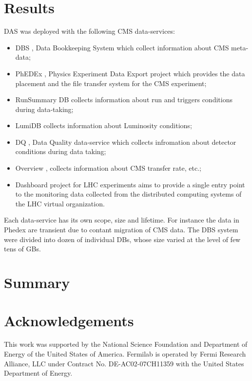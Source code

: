 \documentclass[a4paper]{jpconf}
\begin{document}
\section{Results\label{Results}}
DAS was deployed with the following CMS data-services:
\begin{itemize}
\item DBS \cite{DBS}, Data Bookkeeping System which collect information
about CMS meta-data;
\item PhEDEx \cite{Phedex}, Physics Experiment Data Export project which
provides the data placement and the file transfer system for the CMS experiment;
\item RunSummary DB \cite{RunSummary} collects information about run and triggers
conditions during data-taking;
\item LumiDB \cite{LumiDB} collects information about Luminosity conditions;
\item DQ \cite{DQ}, Data Quality data-service which collects infromation
about detector conditions during data taking;
\item Overview \cite{Overview}, collects information about CMS
transfer rate, etc.;
\item Dashboard \cite{Dashboard} project for LHC experiments aims to 
provide a single entry point to the monitoring data collected from the 
distributed computing systems of the LHC virtual organization.
\end{itemize}
Each data-service has its own scope, size and lifetime. For instance the data
in Phedex are transient due to contant migration of CMS data. The DBS system
were divided into dozen of individual DBs, whose size varied at the level of
few tens of GBs.

\section{Summary}

\section{Acknowledgements}

This work was supported by the National Science Foundation and Department of Energy of the United States of America. Fermilab is operated by Fermi Research Alliance, LLC under Contract
No. DE-AC02-07CH11359 with the United States Department of Energy.
\end{document}
